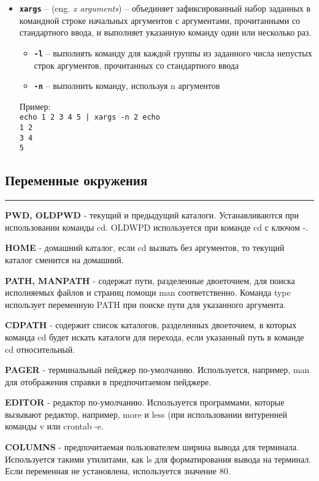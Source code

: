 \documentclass[12pt, a4paper]{article}
\begin{document}
\begin{itemize}
  \item \textbf{\texttt{xargs}} -- (eng. \textit{x arguments}) -- объединяет
    зафиксированный набор заданных в командной строке начальных аргументов с
    аргументами, прочитанными со стандартного ввода, и выполняет указанную
    команду один или несколько раз.
  \begin{itemize}
    \item \textbf{\texttt{-l}} -- выполнять команду для каждой группы из
      заданного числа непустых строк аргументов, прочитанных со стандартного
      ввода
    \item \textbf{\texttt{-n}} -- выполнить команду, используя n аргументов 
  \end{itemize}
  Пример:\\\texttt{echo 1 2 3 4 5 | xargs -n 2 echo}\\
  \texttt{1 2\\3 4\\5}
\end{itemize}
\subsection{Переменные окружения}
\par\noindent\rule{\textwidth}{0.4pt}
\textbf{PWD, OLDPWD} - текущий и предыдущий каталоги. Устанавливаются при использовании
команды cd. OLDWPD используется при команде cd с ключом -.

\textbf{HOME} - домашний каталог, если cd вызвать без аргументов, то текущий каталог сменится на домашний.

\textbf{PATH, MANPATH} - содержат пути, разделенные двоеточием, для поиска
исполняемых файлов и страниц помощи man соответственно. Команда type использует
переменную PATH при поиске пути для указанного аргумента.

\textbf{CDPATH} - содержит список каталогов, разделенных двоеточием, в которых
команда cd будет искать каталоги для перехода, если указанный путь в команде cd относительный.

\textbf{PAGER} - терминальный пейджер по-умолчанию. Используется, например, man
для отображения справки в предпочитаемом пейджере.

\textbf{EDITOR} - редактор по-умолчанию. Используется программами, которые
вызывают редактор, например, more и less (при использовании внтуренней команды
v или crontab -e.

\textbf{COLUMNS} - предпочитаемая пользователем ширина вывода для терминала.
Используется такими утилитами, как ls для форматирования вывода на терминал.
Если переменная не установлена, используется значение 80.
\end{document}
